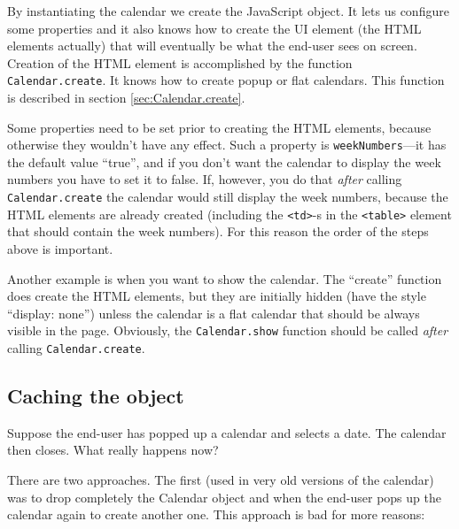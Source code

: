 \documentclass[a4paper,10pt]{article}
\begin{document}
{\begin{small}
\end{small}}

By instantiating the calendar we create the JavaScript object.  It lets us
configure some properties and it also knows how to create the UI element (the
HTML elements actually) that will eventually be what the end-user sees on
screen.  Creation of the HTML element is accomplished by the function
\texttt{Calendar.create}.  It knows how to create popup or flat calendars.
This function is described in section \ref{sec:Calendar.create}.

Some properties need to be set prior to creating the HTML elements, because
otherwise they wouldn't have any effect.  Such a property is
\texttt{weekNumbers}---it has the default value ``true'', and if you don't
want the calendar to display the week numbers you have to set it to false.  If,
however, you do that \emph{after} calling \texttt{Calendar.create} the calendar
would still display the week numbers, because the HTML elements are already
created (including the \texttt{<td>}-s in the \texttt{<table>} element that
should contain the week numbers).  For this reason the order of the steps above
is important.

Another example is when you want to show the calendar.  The ``create'' function
does create the HTML elements, but they are initially hidden (have the style
``display: none'') unless the calendar is a flat calendar that should be always
visible in the page.  Obviously, the \texttt{Calendar.show} function should be
called \emph{after} calling \texttt{Calendar.create}.

\subsection{Caching the object}

Suppose the end-user has popped up a calendar and selects a date.  The calendar
then closes.  What really happens now?

There are two approaches.  The first (used in very old versions of the
calendar) was to drop completely the Calendar object and when the end-user pops
up the calendar again to create another one.  This approach is bad for more
reasons:
\end{document}
